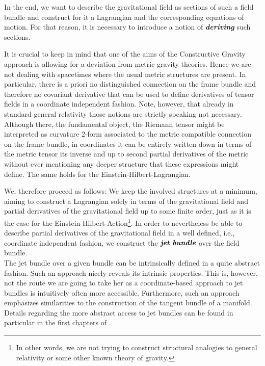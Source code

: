 \documentclass[a4paper,12pt, DIV=14, BCOR=5mm, twoside, headsepline, numbers=noenddot]{scrbook}
\begin{document}
In the end, we want to describe the gravitational field as sections of such a field bundle and construct for it a Lagrangian and the corresponding equations of motion. For that reason, it is necessary to introduce a notion of \textit{\textbf{deriving}} such sections. 

It is crucial to keep in mind that one of the aims of the Constructive Gravity approach is allowing for a deviation from metric gravity theories. Hence we are not dealing with spacetimes where the usual metric structures are present. In particular, there is a priori no distinguished connection on the frame bundle and therefore no covariant derivative that can be used to define derivatives of tensor fields in a coordinate independent fashion. Note, however, that already in standard general relativity those notions are strictly speaking not necessary. Although there, the fundamental object, the Riemann tensor might be interpreted as curvature 2-form associated to the metric compatible connection on the frame bundle, in coordinates it can be entirely written down in terms of the metric tensor its inverse and up to second partial derivatives of the metric without ever mentioning any deeper structure that these expressions might define. The same holds for the Einstein-Hilbert-Lagrangian. 

We, therefore proceed as follows: We keep the involved structures at a minimum, aiming to construct a Lagrangian solely in terms of the gravitational field and partial derivatives of the gravitational field up to some finite order, just as it is the case for the Einstein-Hilbert-Action\footnote{In other words, we are not trying to construct structural analogies to general relativity or some other known theory of gravity.}. In order to nevertheless be able to describe partial derivatives of the gravitational field in a well defined, i.e., coordinate independent fashion, we construct the $\textit{\textbf{jet bundle}}$ over the field bundle.  \\

The jet bundle over a given bundle can be intrinsically defined in a quite abstract fashion. Such an approach nicely reveals its intrinsic properties. This is, however, not the route we are going to take her as a coordinate-based approach to jet bundles is intuitively often more accessible. Furthermore, such an approach emphasizes similarities to the construction of the tangent bundle of a manifold. Details regarding the more abstract access to jet bundles can be found in particular in the first chapters of \cite{seiler2009involution}. 
\end{document}
